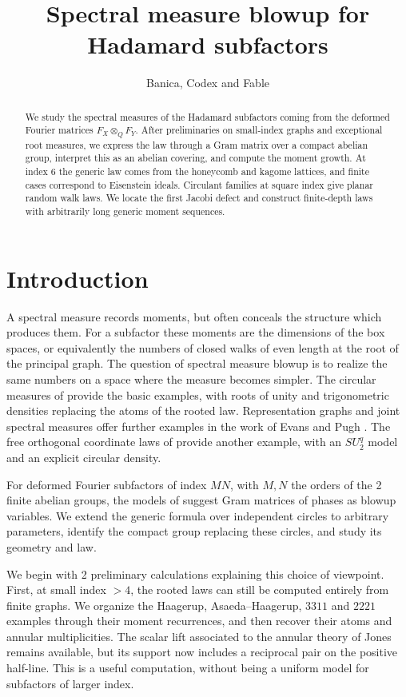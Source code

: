 \documentclass[11pt,reqno]{amsart}
\title[Spectral measure blowup]{Spectral measure blowup for Hadamard subfactors}
\author{Banica, Codex and Fable}
\theoremstyle{definition}
\numberwithin{equation}{section}
\begin{document}
\begin{abstract}
We study the spectral measures of the Hadamard subfactors coming from the deformed Fourier matrices $F_X\otimes_QF_Y$. After preliminaries on small-index graphs and exceptional root measures, we express the law through a Gram matrix over a compact abelian group, interpret this as an abelian covering, and compute the moment growth. At index 6 the generic law comes from the honeycomb and kagome lattices, and finite cases correspond to Eisenstein ideals. Circulant families at square index give planar random walk laws. We locate the first Jacobi defect and construct finite-depth laws with arbitrarily long generic moment sequences.
\end{abstract}
\maketitle
\setcounter{tocdepth}{1}
\tableofcontents

\section*{Introduction}

A spectral measure records moments, but often conceals the structure which produces them. For a subfactor these moments are the dimensions of the box spaces, or equivalently the numbers of closed walks of even length at the root of the principal graph. The question of spectral measure blowup is to realize the same numbers on a space where the measure becomes simpler. The circular measures of \cite{BB07,Ban09} provide the basic examples, with roots of unity and trigonometric densities replacing the atoms of the rooted law. Representation graphs and joint spectral measures offer further examples in the work of Evans and Pugh \cite{EP10,EP11,EP15}. The free orthogonal coordinate laws of \cite{BCZ09} provide another example, with an $SU_2^q$ model and an explicit circular density.

For deformed Fourier subfactors of index $MN$, with $M,N$ the orders of the 2 finite abelian groups, the models of \cite{BBi15} suggest Gram matrices of phases as blowup variables. We extend the generic formula over independent circles to arbitrary parameters, identify the compact group replacing these circles, and study its geometry and law.

We begin with 2 preliminary calculations explaining this choice of viewpoint. First, at small index $>4$, the rooted laws can still be computed entirely from finite graphs. We organize the Haagerup, Asaeda--Haagerup, $3311$ and $2221$ examples \cite{AH99,Haa94,JMS14} through their moment recurrences, and then recover their atoms and annular multiplicities. The scalar lift associated to the annular theory of Jones \cite{Jon01} remains available, but its support now includes a reciprocal pair on the positive half-line. This is a useful computation, without being a uniform model for subfactors of larger index.
\end{document}
